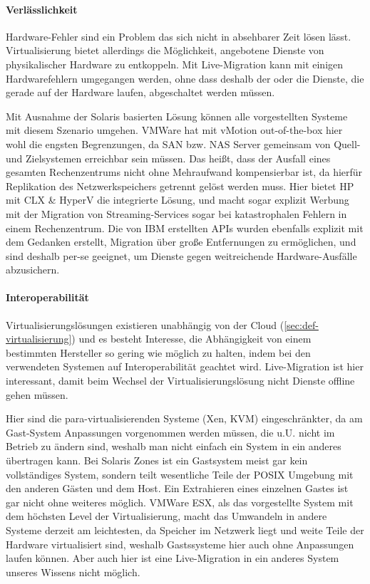 \paragraph{Verlässlichkeit}
Hardware-Fehler sind ein Problem das sich nicht in absehbarer Zeit
lösen lässt. Virtualisierung bietet allerdings die Möglichkeit,
angebotene Dienste von physikalischer Hardware zu entkoppeln. Mit
Live-Migration kann mit einigen Hardwarefehlern umgegangen werden,
ohne dass deshalb der oder die Dienste, die gerade auf der Hardware
laufen, abgeschaltet werden müssen.

Mit Ausnahme der Solaris basierten Lösung können alle vorgestellten
Systeme mit diesem Szenario umgehen. VMWare hat mit vMotion
out-of-the-box hier wohl die engsten Begrenzungen, da \ac{SAN}
bzw. \ac{NAS} Server gemeinsam von Quell- und Zielsystemen erreichbar
sein müssen. Das heißt, dass der Ausfall eines gesamten Rechenzentrums
nicht ohne Mehraufwand kompensierbar ist, da hierfür Replikation des
Netzwerkspeichers getrennt gelöst werden muss. Hier bietet HP mit
\ac{CLX} \& HyperV die integrierte Lösung, und macht sogar explizit
Werbung mit der Migration von Streaming-Services sogar bei
katastrophalen Fehlern in einem Rechenzentrum. Die von IBM erstellten
APIs wurden ebenfalls explizit mit dem Gedanken erstellt, Migration
über große Entfernungen zu ermöglichen, und sind deshalb per-se
geeignet, um Dienste gegen weitreichende Hardware-Ausfälle
abzusichern.

\paragraph{Interoperabilität}
Virtualisierungslösungen existieren unabhängig von der Cloud
(\autoref{sec:def-virtualisierung}) und es besteht Interesse, die
Abhängigkeit von einem bestimmten Hersteller so gering wie möglich zu
halten, indem bei den verwendeten Systemen auf Interoperabilität
geachtet wird. Live-Migration ist hier interessant, damit beim Wechsel
der Virtualisierungslösung nicht Dienste offline gehen müssen.

Hier sind die para-virtualisierenden Systeme (Xen, \ac{KVM})
eingeschränkter, da am Gast-System Anpassungen vorgenommen werden
müssen, die u.U. nicht im Betrieb zu ändern sind, weshalb man nicht
einfach ein System in ein anderes übertragen kann. Bei Solaris Zones
ist ein Gastsystem meist gar kein vollständiges System, sondern teilt
wesentliche Teile der POSIX Umgebung mit den anderen Gästen und dem
Host. Ein Extrahieren eines einzelnen Gastes ist gar nicht ohne
weiteres möglich. VMWare ESX, als das vorgestellte System mit dem
höchsten Level der Virtualisierung, macht das Umwandeln in andere
Systeme derzeit am leichtesten, da Speicher im Netzwerk liegt und
weite Teile der Hardware virtualisiert sind, weshalb Gastssysteme hier
auch ohne Anpassungen laufen können. Aber auch hier ist eine
Live-Migration in ein anderes System unseres Wissens nicht möglich.


